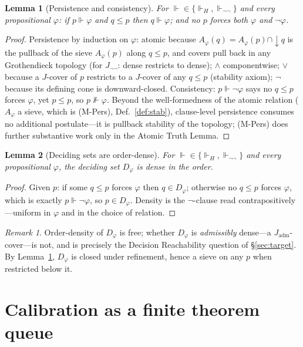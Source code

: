 \documentclass[11pt]{article}
\newtheorem{lemma}{Lemma}
\theoremstyle{definition}
\theoremstyle{remark}
\newtheorem*{remark}{Remark}
\newcommand{\forcesH}{\Vdash_{H}}
\newcommand{\forcesnn}{\Vdash_{\neg\neg}}
\newcommand{\refines}{\leq}
\newcommand{\Jadm}{J_{\mathrm{adm}}}
\newcommand{\Jnn}{J_{\neg\neg}}
\begin{document}
\begin{lemma}[Persistence and consistency]\label{lem:pers}
For $\Vdash\in\{\forcesH,\forcesnn\}$ and every propositional $\varphi$: if $p\Vdash\varphi$ and
$q\refines p$ then $q\Vdash\varphi$; and no $p$ forces both $\varphi$ and $\neg\varphi$.
\end{lemma}
\begin{proof}
Persistence by induction on $\varphi$: atomic because $A_\varphi(q)=A_\varphi(p)\cap{\downarrow}q$
is the pullback of the sieve $A_\varphi(p)$ along $q\refines p$, and covers pull back in any
Grothendieck topology (for $\Jnn$: dense restricts to dense); $\wedge$ componentwise; $\vee$
because a $J$-cover of $p$ restricts to a $J$-cover of any $q\refines p$ (stability axiom); $\neg$
because its defining cone is downward-closed. Consistency: $p\Vdash\neg\varphi$ says no
$q\refines p$ forces $\varphi$, yet $p\refines p$, so $p\not\Vdash\varphi$. Beyond the
well-formedness of the atomic relation ($A_\varphi$ a sieve, which is (M-Pers),
Def.~\ref{def:stab}), clause-level persistence consumes no additional postulate---it is pullback
stability of the topology; (M-Pers) does further substantive work only in the Atomic Truth Lemma.
\end{proof}

\begin{lemma}[Deciding sets are order-dense]\label{lem:dec}
For $\Vdash\in\{\forcesH,\forcesnn\}$ and every propositional $\varphi$, the deciding set
$D_\varphi$ is dense in the order.
\end{lemma}
\begin{proof}
Given $p$: if some $q\refines p$ forces $\varphi$ then $q\in D_\varphi$; otherwise no $q\refines p$
forces $\varphi$, which is exactly $p\Vdash\neg\varphi$, so $p\in D_\varphi$. Density is the
$\neg$-clause read contrapositively---uniform in $\varphi$ and in the choice of relation.
\end{proof}

\begin{remark}
Order-density of $D_\varphi$ is free; whether $D_\varphi$ is \emph{admissibly} dense---a
$\Jadm$-cover---is not, and is precisely the Decision Reachability question of \S\ref{sec:target}. By
Lemma~\ref{lem:pers}, $D_\varphi$ is closed under refinement, hence a sieve on any $p$ when
restricted below it.
\end{remark}

\section{Calibration as a finite theorem queue}\label{sec:calibration}
\end{document}
